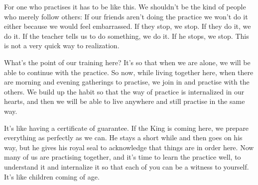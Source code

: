 For one who practises it has to be like this. We shouldn't be the kind of people who merely follow others: If our friends aren't doing the practice we won't do it either because we would feel embarrassed. If they stop, we stop. If they do it, we do it. If the teacher tells us to do something, we do it. If he stops, we stop. This is not a very quick way to realization.

What's the point of our training here? It's so that when we are alone, we will be able to continue with the practice. So now, while living together here, when there are morning and evening gatherings to practise, we join in and practise with the others. We build up the habit so that the way of practice is internalized in our hearts, and then we will be able to live anywhere and still practise in the same way.

It's like having a certificate of guarantee. If the King is coming here, we prepare everything as perfectly as we can. He stays a short while and then goes on his way, but he gives his royal seal to acknowledge that things are in order here. Now many of us are practising together, and it's time to learn the practice well, to understand it and internalize it so that each of you can be a witness to yourself. It's like children coming of age.

